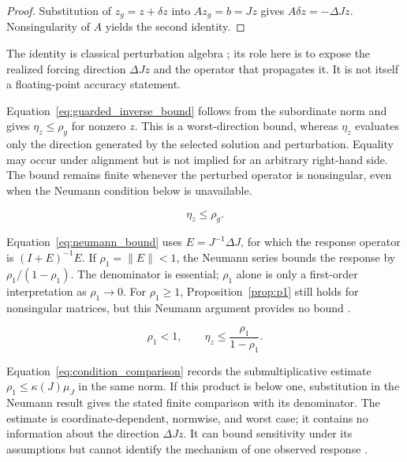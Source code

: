 \documentclass[preprint,12pt]{elsarticle}
\theoremstyle{definition}
\begin{document}
\begin{proof}
Substitution of $z_g=z+\delta z$ into $Az_g=b=Jz$ gives
$A\delta z=-\Delta Jz$. Nonsingularity of $A$ yields the second identity.
\end{proof}

The identity is classical perturbation algebra \cite{S02,S03}; its role here is to expose the realized forcing direction $\Delta Jz$ and the operator that propagates it. It is not itself a floating-point accuracy statement.

Equation~\eqref{eq:guarded_inverse_bound} follows from the subordinate norm and gives $\eta_z\leq\rho_g$ for nonzero $z$. This is a worst-direction bound, whereas $\eta_z$ evaluates only the direction generated by the selected solution and perturbation. Equality may occur under alignment but is not implied for an arbitrary right-hand side. The bound remains finite whenever the perturbed operator is nonsingular, even when the Neumann condition below is unavailable.

\begin{linenomath*}
\begin{equation}
\eta_z \leq \rho_g.
\label{eq:guarded_inverse_bound}
\end{equation}
\end{linenomath*}

Equation~\eqref{eq:neumann_bound} uses $E=J^{-1}\Delta J$, for which the response operator is $(I+E)^{-1}E$. If $\rho_1=\lVert E\rVert<1$, the Neumann series bounds the response by $\rho_1/(1-\rho_1)$. The denominator is essential; $\rho_1$ alone is only a first-order interpretation as $\rho_1\to0$. For $\rho_1\geq1$, Proposition~\ref{prop:p1} still holds for nonsingular matrices, but this Neumann argument provides no bound \cite{S02,S03}.

\begin{linenomath*}
\begin{equation}
\rho_1<1,\qquad
\eta_z \leq \frac{\rho_1}{1-\rho_1}.
\label{eq:neumann_bound}
\end{equation}
\end{linenomath*}

Equation~\eqref{eq:condition_comparison} records the submultiplicative estimate $\rho_1\leq\kappa(J)\mu_J$ in the same norm. If this product is below one, substitution in the Neumann result gives the stated finite comparison with its denominator. The estimate is coordinate-dependent, normwise, and worst case; it contains no information about the direction $\Delta Jz$. It can bound sensitivity under its assumptions but cannot identify the mechanism of one observed response \cite{S01,S03}.
\end{document}
